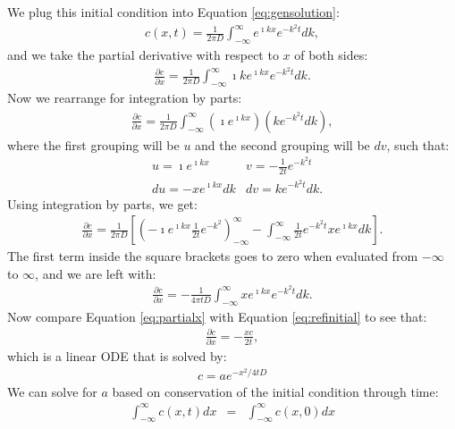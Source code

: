 \documentclass[draft, jgrga]{AGUTeX}
\begin{document}
\begin{article}
We plug this initial condition into Equation \ref{eq:gensolution}:
\begin{eqnarray}
  \label{eq:refinitial}
c(x,t) = \frac{1}{2 \pi D} \int^\infty_{-\infty} e^{\imath kx} e^{-k^2t} dk,
\end{eqnarray}
and we take the partial derivative with respect to $x$ of both sides:
\begin{eqnarray}
\frac{\partial c}{\partial x} = \frac {1}{2 \pi D}
\int^\infty_{-\infty} \imath k e^{\imath kx} e^{-k^2t} dk.
\end{eqnarray}
Now we rearrange for integration by parts:
\begin{eqnarray}
\frac{\partial c}{\partial x} = \frac {1}{2 \pi D}
\int^\infty_{-\infty} \left( \imath e^{\imath kx} \right) \left(k e^{-k^2t} dk \right),
\end{eqnarray}
where the first grouping will be $u$ and the second grouping will be $dv$, such that:
\begin{eqnarray}
& u = \imath e^{\imath kx} & v=-\frac{1}{2t} e^{-k^2t} \nonumber \\
& du = - xe^{\imath kx}dk & dv = k e^{-k^2t}dk. \nonumber
\end{eqnarray}
Using integration by parts, we get:
\begin{eqnarray}
\frac{\partial c}{\partial x} = \frac{1}{2 \pi D} \left[ \left(- \imath e^{\imath kx}
\frac{1}{2t} e^{-k^2} \right)^\infty_{-\infty} - \int^\infty_{-\infty} \frac {1}{2t}
e^{-k^2t} xe^{\imath kx} dk \right].
\end{eqnarray}
The first term inside the square brackets goes to zero when evaluated from $-\infty$ to $\infty$, and we are left with:
\begin{eqnarray}
  \label{eq:partialx}
\frac{\partial c}{\partial x} = - \frac{1}{4 \pi t D} \int^\infty_{-\infty}
xe^{\imath kx}e^{-k^2t} dk.
\end{eqnarray}
Now compare Equation \ref{eq:partialx} with Equation \ref{eq:refinitial} to see that:
\begin{eqnarray}
\frac{\partial c}{\partial x} = - \frac{xc}{2t},
\end{eqnarray}
which is a linear ODE that is solved by:
\begin{eqnarray}
  \label{eq:linODE}
c = a e^{-x^2/4tD}
\end{eqnarray}
We can solve for $a$ based on conservation of the initial condition through time:
\begin{eqnarray}
\int^\infty_{-\infty} c(x,t) dx & = & \int^\infty_{-\infty} c(x,0) dx  \nonumber \\

\end{eqnarray}
\end{article}
\end{document}

